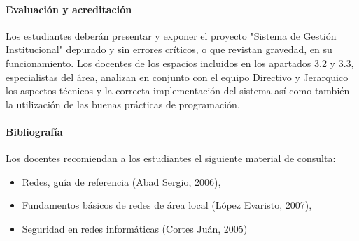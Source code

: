 \paragraph{Evaluación y acreditación}

Los estudiantes deberán presentar y exponer el proyecto "Sistema de Gestión Institucional" depurado y sin errores críticos, o que revistan gravedad, en su funcionamiento. Los docentes de los espacios incluidos en los apartados 3.2 y 3.3, especialistas del área, analizan en conjunto con el equipo Directivo y Jerarquico los aspectos técnicos y la correcta implementación del sistema así como también la utilización de las buenas prácticas de programación.

\paragraph{Bibliografía} Los docentes recomiendan a los estudiantes el siguiente material de consulta:
\begin{itemize}
    \item Redes, guía de referencia (Abad Sergio, 2006), 
    \item Fundamentos básicos de redes de área local (López Evaristo, 2007), 
    \item Seguridad en redes informáticas (Cortes Juán, 2005)


\end{itemize}
